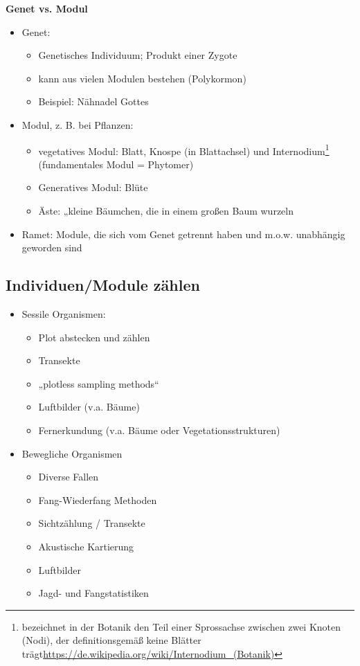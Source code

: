 \newpage
\textbf{Genet vs. Modul}
\begin{itemize}
	\item Genet:
	\begin{itemize}
		\item Genetisches Individuum; Produkt einer Zygote
		\item kann aus vielen Modulen bestehen (Polykormon)
		\item Beispiel: Nähnadel Gottes
	\end{itemize}
	\item Modul, z. B. bei Pflanzen:
	\begin{itemize}
		\item vegetatives Modul: Blatt, Knospe (in Blattachsel) und Internodium\footnote{bezeichnet in der Botanik den Teil einer Sprossachse zwischen zwei Knoten (Nodi), der definitionsgemäß keine Blätter trägt\url{https://de.wikipedia.org/wiki/Internodium_(Botanik)}} (fundamentales Modul = Phytomer)
		\item Generatives Modul: Blüte
		\item Äste: „kleine Bäumchen, die in einem großen Baum wurzeln
	\end{itemize}
	\item Ramet: Module, die sich vom Genet getrennt haben und m.o.w. unabhängig geworden sind
\end{itemize}

\subsection{Individuen/Module zählen}
\begin{itemize}
	\item Sessile Organismen:
	\begin{itemize}
		\item Plot abstecken und zählen
		\item Transekte
		\item „plotless sampling methods“
		\item Luftbilder (v.a. Bäume)
		\item Fernerkundung (v.a. Bäume oder Vegetationsstrukturen)
	\end{itemize}
	\item Bewegliche Organismen
	\begin{itemize}
		\item Diverse Fallen
		\item Fang-Wiederfang Methoden
		\item Sichtzählung / Transekte
		\item Akustische Kartierung
		\item Luftbilder
		\item Jagd- und Fangstatistiken
	\end{itemize}
\end{itemize}

